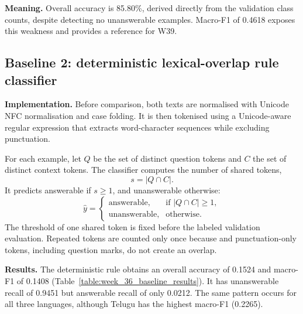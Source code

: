 \documentclass[11pt,a4paper]{article}
\begin{document}
\textbf{Meaning.} Overall accuracy is 85.80\%, derived directly from the validation class counts, despite detecting no unanswerable examples. Macro-F1 of 0.4618 exposes this weakness and provides a reference for W39.

\subsection{Baseline 2: deterministic lexical-overlap rule classifier}

\textbf{Implementation.}
Before comparison, both texts are normalised with Unicode NFC normalisation and case folding. It is then tokenised using a Unicode-aware regular expression that extracts word-character sequences while excluding punctuation. 

\noindent 
For each example, let $Q$ be the set of distinct question tokens and $C$ the set of distinct context tokens. The classifier computes the number of shared tokens,
\[
s = |Q \cap C|.
\]
It predicts answerable if $s \geq 1$, and unanswerable otherwise:
\[
    \hat{y} =
        \begin{cases}
            \text{answerable}, & \text{if } |Q \cap C| \geq 1, \\
            \text{unanswerable}, & \text{otherwise.}
        \end{cases}
\]
The threshold of one shared token is fixed before the labeled validation evaluation. Repeated tokens are counted only once because and punctuation-only tokens, including question marks, do not create an overlap.

\textbf{Results.}
The deterministic rule obtains an overall accuracy of 0.1524 and macro-F1 of 0.1408 (Table~\ref{table:week_36_baseline_results}). It has unanswerable recall of 0.9451 but answerable recall of only 0.0212. The same pattern occurs for all three languages, although Telugu has the highest macro-F1 (0.2265).
\end{document}
